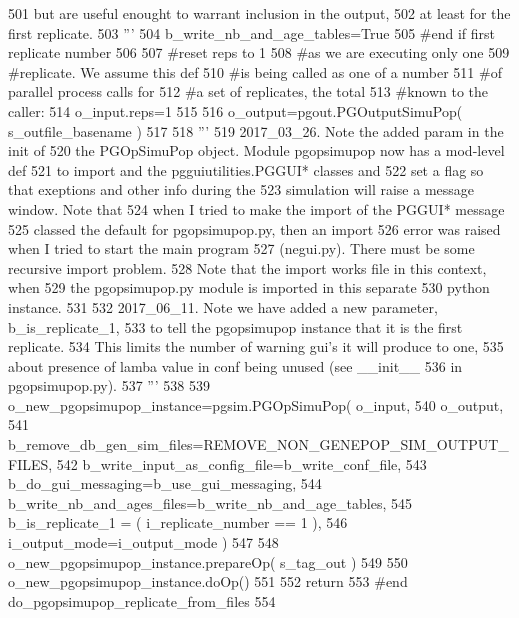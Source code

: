 \begin{DoxyCode}
501 \textcolor{stringliteral}{        but are useful enought to warrant inclusion in the output,}
502 \textcolor{stringliteral}{        at least for the first replicate.}
503 \textcolor{stringliteral}{        '''}
504         b\_write\_nb\_and\_age\_tables=\textcolor{keyword}{True}
505     \textcolor{comment}{#end if first replicate number}
506 
507     \textcolor{comment}{#reset reps to 1}
508     \textcolor{comment}{#as we are executing only one}
509     \textcolor{comment}{#replicate.  We assume this def}
510     \textcolor{comment}{#is being called as one of a number}
511     \textcolor{comment}{#of parallel process calls for}
512     \textcolor{comment}{#a set of replicates, the total }
513     \textcolor{comment}{#known to the caller:}
514     o\_input.reps=1
515 
516     o\_output=pgout.PGOutputSimuPop( s\_outfile\_basename )
517 
518     \textcolor{stringliteral}{'''}
519 \textcolor{stringliteral}{    2017\_03\_26. Note the added param in the init of}
520 \textcolor{stringliteral}{    the PGOpSimuPop object.  Module pgopsimupop now has a mod-level def}
521 \textcolor{stringliteral}{    to import and the pgguiutilities.PGGUI* classes and }
522 \textcolor{stringliteral}{    set a flag so that exeptions and other info during the}
523 \textcolor{stringliteral}{    simulation will raise a message window.  Note that }
524 \textcolor{stringliteral}{    when I tried to make the import of the PGGUI* message}
525 \textcolor{stringliteral}{    classed the default for pgopsimupop.py, then an import}
526 \textcolor{stringliteral}{    error was raised when I tried to start the main program}
527 \textcolor{stringliteral}{    (negui.py).  There must be some recursive import problem.}
528 \textcolor{stringliteral}{    Note that the import works file in this context, when}
529 \textcolor{stringliteral}{    the pgopsimupop.py module is imported in this separate}
530 \textcolor{stringliteral}{    python instance.}
531 \textcolor{stringliteral}{}
532 \textcolor{stringliteral}{    2017\_06\_11. Note we have added a new parameter, b\_is\_replicate\_1,}
533 \textcolor{stringliteral}{    to tell the pgopsimupop instance that it is the first replicate.}
534 \textcolor{stringliteral}{    This limits the number of warning gui's it will produce to one,}
535 \textcolor{stringliteral}{    about presence of lamba value in conf being unused (see \_\_init\_\_}
536 \textcolor{stringliteral}{    in pgopsimupop.py).}
537 \textcolor{stringliteral}{    '''}
538 
539     o\_new\_pgopsimupop\_instance=pgsim.PGOpSimuPop( o\_input,
540             o\_output, 
541             b\_remove\_db\_gen\_sim\_files=REMOVE\_NON\_GENEPOP\_SIM\_OUTPUT\_FILES,
542             b\_write\_input\_as\_config\_file=b\_write\_conf\_file,
543             b\_do\_gui\_messaging=b\_use\_gui\_messaging,
544             b\_write\_nb\_and\_ages\_files=b\_write\_nb\_and\_age\_tables,
545             b\_is\_replicate\_1 = ( i\_replicate\_number == 1 ),
546             i\_output\_mode=i\_output\_mode )
547 
548     o\_new\_pgopsimupop\_instance.prepareOp( s\_tag\_out  )
549 
550     o\_new\_pgopsimupop\_instance.doOp()
551 
552     \textcolor{keywordflow}{return}
553 \textcolor{comment}{#end do\_pgopsimupop\_replicate\_from\_files}
554 
\end{DoxyCode}
